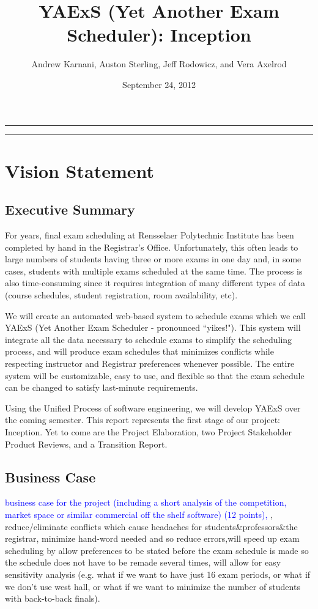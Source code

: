\documentclass[11pt]{article}
\author{Andrew Karnani, Auston Sterling, Jeff Rodowicz, and Vera Axelrod}
\title{YAExS {(Yet Another Exam Scheduler)}: Inception}
\date{September 24, 2012}
\begin{document}
\maketitle
\vspace{-0.1in}
\hrule

\tableofcontents %

\vspace{0.3in}
\hrule

\section{Vision Statement}
\subsection{Executive Summary} %

For years, final exam scheduling at Rensselaer Polytechnic Institute has been
 completed by hand in the Registrar’s Office. 
Unfortunately, this often leads to large numbers of students having three or more
 exams in one day and, in some cases, students with multiple exams scheduled at
 the same time.  
 The process is also time-consuming since it requires integration of many different
 types of data (course schedules, student registration, room availability, etc). 

We will create an automated web-based system to schedule exams which we call YAExS 
(Yet Another Exam Scheduler - pronounced ``yikes!").
This system will integrate all the data necessary to schedule exams to simplify the 
scheduling process, and will produce exam schedules that minimizes conflicts 
while respecting instructor and Registrar preferences whenever possible.  
The entire system will be customizable, easy to use, and flexible 
so that the exam schedule can be changed to satisfy last-minute requirements.

Using the Unified Process of software engineering, we will develop YAExS
 over the coming semester. 
This report represents the first stage of our project: Inception. 
Yet to come are the Project Elaboration, two Project Stakeholder Product Reviews,
 and a Transition Report.


\subsection{Business Case} %
\textcolor{blue}{ business case for the project (including a short analysis of the
 competition, market space or similar commercial off the shelf software) (12 points),}
, reduce/eliminate conflicts which cause headaches for students\&professors\&the registrar, minimize hand-word needed and so reduce errors,will speed up exam scheduling by allow preferences to be stated before the exam schedule is made so the schedule does not have to be remade several times, will allow for easy sensitivity analysis (e.g. what if we want to have just 16 exam periods, or what if we don't use west hall, or what if we want to minimize the number of students with back-to-back finals).
\end{document}
